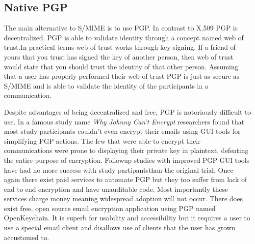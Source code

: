 \documentclass[10pt,twocolumn]{article}
\begin{document}
\subsection{Native PGP}
\par The main alternative to S/MIME is to use PGP. In contrast to X.509 PGP is decentralized. PGP is able to validate identity through a concept named web of trust.In practical terms web of trust works through key signing. If a friend of yours that you trust has signed the key of another person, then web of trust would state that you should trust the identity of that other person\cite{zimmermann1995official}. Assuming that a user has properly performed their web of trust PGP is just as secure as S/MIME and is able to validate the identity of the participants in a communication\cite{furnell2013usable}.
\par Despite advantages of being decentralized and free, PGP is notoriously difficult to use. In a famous study name \textit{Why Johnny Can't Encrypt} researchers found that most study participants couldn't even encrypt their emails using GUI tools for simplifying PGP actions. The few that were able to encrypt their communications were prone to displaying their private key in plaintext, defeating the entire purpose of encryption\cite{whitten1999johnny}. Followup studies with improved PGP GUI tools have had no more success with study partipantsthan the original trial\cite{sheng2006johnny}. Once again there exist paid services to automate PGP but they too suffer from lack of end to end encryption and have unauditable code\cite{ciphermail-gateway,hushmail,eff-scorecard}. Most importantly these services charge money meaning widespread adoption will not occur. There does exist free, open source email encryption application using PGP named OpenKeychain. It is superb for usability and accessibility but it requires a user to use a special email client and disallows use of clients that the user has grown accustomed to\cite{openkeychain}.
\end{document}
